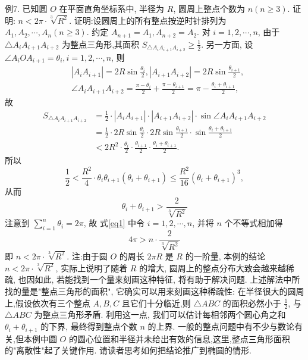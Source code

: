 例7. 已知圆 $O$ 在平面直角坐标系中, 半径为 $R$, 圆周上整点个数为 $n(n \geqslant 3)$. 证明: $n<2 \pi \cdot \sqrt[3]{R^2}$.
证明:设圆周上的所有整点按逆时针排列为 $A_1, A_2, \cdots, A_n(n \geqslant 3)$.
约定 $A_{n+1}=A_1, A_{n+2}=A_2$. 对 $i=1,2, \cdots, n$, 由于 $\triangle A_i A_{i+1} A_{i+2}$ 为整点三角形,其面积 $S_{\triangle A_i A_{i+1} A_{i+2}} \geqslant \frac{1}{2}$.
另一方面, 设 $\angle A_i O A_{i+1}=\theta_i, i=1,2, \cdots, n$, 则
$$
\begin{aligned}
& \left|A_i A_{i+1}\right|=2 R \sin \frac{\theta_i}{2},\left|A_{i+1} A_{i+2}\right|=2 R \sin \frac{\theta_{i+1}}{2}, \\
& \angle A_i A_{i+1} A_{i+2}=\frac{\pi-\theta_i}{2}+\frac{\pi-\theta_{i+1}}{2}=\pi-\frac{\theta_i+\theta_{i+1}}{2},
\end{aligned}
$$
故
$$
\begin{aligned}
S_{\triangle A_i A_{i+1} A_{i+2}} & =\frac{1}{2} \cdot\left|A_i A_{i+1}\right| \cdot\left|A_{i+1} A_{i+2}\right| \cdot \sin \angle A_i A_{i+1} A_{i+2} \\
& =\frac{1}{2} \cdot 2 R \sin \frac{\theta_i}{2} \cdot 2 R \sin \frac{\theta_{i+1}}{2} \cdot \sin \frac{\theta_i+\theta_{i+1}}{2} \\
& <2 R^2 \cdot \frac{\theta_i}{2} \cdot \frac{\theta_{i+1}}{2} \cdot \frac{\theta_i+\theta_{i+1}}{2} .
\end{aligned}
$$
所以
$$
\frac{1}{2}<\frac{R^2}{4} \cdot \theta_i \theta_{i+1}\left(\theta_i+\theta_{i+1}\right) \leqslant \frac{R^2}{16}\left(\theta_i+\theta_{i+1}\right)^3,
$$
从而
$$
\theta_i+\theta_{i+1}>\frac{2}{\sqrt[3]{R^2}} \label{eq1}
$$
注意到 $\sum_{i=1}^n \theta_i=2 \pi$, 故 式\ref{eq1} 中令 $i=1,2, \cdots, n$, 并将 $n$ 个不等式相加得
$$
4 \pi>n \cdot \frac{2}{\sqrt[3]{R^2}}
$$
即 $n<2 \pi \cdot \sqrt[3]{R^2}$.
注:由于圆 $O$ 的周长 $2 \pi R$ 是 $R$ 的一阶量, 本例的结论 $n<2 \pi \cdot \sqrt[3]{R^2}$, 实际上说明了随着 $R$ 的增大, 圆周上的整点分布大致会越来越稀疏, 也因如此, 若能找到一个量来刻画这种特征, 将有助于解决问题.
上述解法中所找的量是"整点三角形的面积", 它确实可以用来刻画这种稀疏性: 在半径很大的圆周上,假设依次有三个整点 $A, B, C$ 且它们十分临近,则 $\triangle A B C$ 的面积必然小于 $\frac{1}{2}$, 与 $\triangle A B C$ 为整点三角形矛盾.
利用这一点, 我们可以估计每相邻两个圆心角之和 $\theta_i+\theta_{i+1}$ 的下界, 最终得到整点个数 $n$ 的上界.
一般的整点问题中有不少与数论有关,但本例中圆 $O$ 的圆心位置和半径并未给出有效的信息,这里,整点三角形面积的"离散性"起了关键作用.
请读者思考如何把结论推广到椭圆的情形.


